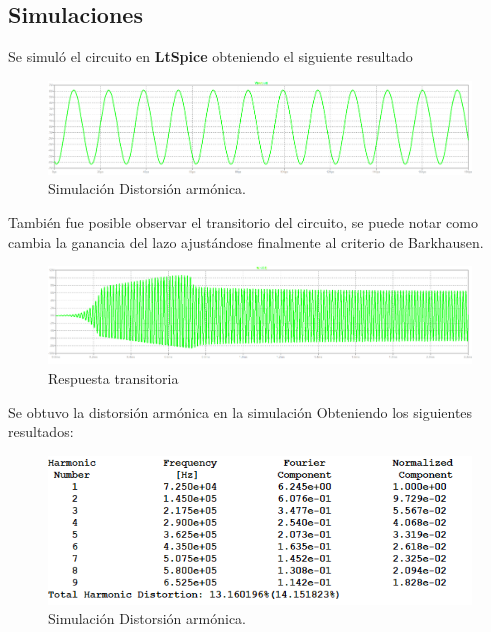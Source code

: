 \subsection{Simulaciones}
Se simuló el circuito en \textbf{LtSpice} obteniendo el siguiente resultado
\begin{figure}[H]
	\centering
	\includegraphics[width=\textwidth]{Imagenes-Ej1/osc.png}
	\caption{Simulación Distorsión armónica.}
	\label{fig:osc}
\end{figure}

También fue posible observar el transitorio del circuito, se puede notar como cambia la ganancia del lazo ajustándose finalmente al criterio de Barkhausen.
\begin{figure}[H]
	\centering
	\includegraphics[width=\textwidth]{Imagenes-Ej1/trans.png}
	\caption{Respuesta transitoria}
	\label{fig:trans}
\end{figure}
Se obtuvo la distorsión armónica en la simulación Obteniendo los siguientes resultados:
\begin{figure}[H]
	\centering
	\includegraphics[width=\textwidth]{Imagenes-Ej1/Distorcion.png}
	\caption{Simulación Distorsión armónica.}
	\label{fig:distSpice}
\end{figure}


